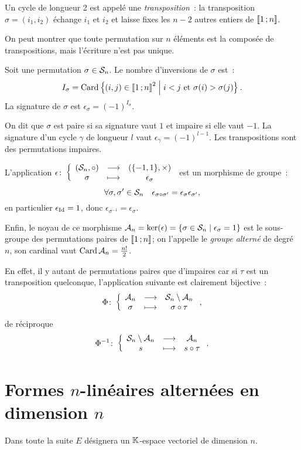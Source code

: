 Un cycle de longueur 2 est appelé une \emph{transposition}~: la transposition $\sigma = (i_1, i_2)$ échange $i_1$ et $i_2$ et laisse fixes les $n-2$ autres entiers de $\intervalleentier{1}{n}$.

On peut montrer que toute permutation sur $n$ éléments est la composée de transpositions, mais l'écriture n'est pas unique.

\begin{defdef}
	Soit une permutation $\sigma \in \S_n$. Le nombre d'inversions de $\sigma$ est~:
	\begin{equation}
		I_\sigma = \Card\enstq{(i,j)\in\intervalleentier{1}{n}^2}{i<j \ \text{et} \ \sigma(i)>\sigma(j)}.
	\end{equation}
	La signature de $\sigma$ est $\epsilon_\sigma = (-1)^{I_\sigma}$.
\end{defdef}
On dit que $\sigma$ est paire si sa signature vaut $1$ et impaire si elle vaut $-1$. La signature d'un cycle $\gamma$ de longueur $l$ vaut $\epsilon_\gamma = (-1)^{l-1}$. Les transpositions sont des permutations impaires.

L'application $\fonction{\epsilon}{(\S_n, \circ)}{(\{-1,1\}, \times)}{\sigma}{\epsilon_\sigma}$ est un morphisme de groupe~:
\begin{equation}
	\forall \sigma, \sigma' \in \S_n \quad \epsilon_{\sigma \circ \sigma'} = \epsilon_\sigma \epsilon_{\sigma'},
\end{equation}
en particulier $\epsilon_{\Id} = 1$, donc $\epsilon_{\sigma^{-1}} = \epsilon_\sigma$.

Enfin, le noyau de ce morphisme $\A_n = \ker(\epsilon) = \enstq{\sigma \in \S_n}{\epsilon_\sigma=1}$ est le sous-groupe des permutations paires de $\intervalleentier{1}{n}$; on l'appelle le \emph{groupe alterné} de degré $n$, son cardinal vaut $\Card \A_n = \frac{n!}{2}$.

En effet, il y autant de permutations paires que d'impaires car si $\tau$ est un transposition quelconque, l'application suivante est clairement bijective~:
\begin{equation}
	\fonction{\Phi}{\A_n}{\S_n\setminus\A_n}{\sigma}{\sigma \circ \tau},
\end{equation}
de réciproque
\begin{equation}
	\fonction{\Phi^{-1}}{\S_n\setminus\A_n}{\A_n}{s}{s \circ \tau}.
\end{equation}
\section{Formes $n$-linéaires alternées en dimension $n$}
Dans toute la suite $E$ désignera un $\K$-espace vectoriel de dimension $n$.

